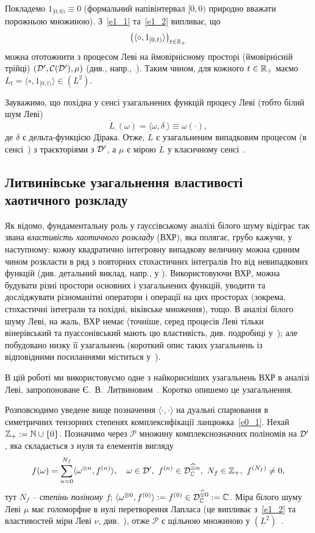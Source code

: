 Покладемо $1_{[0,0)}\equiv 0$ (формальний напівінтервал $[0,0)$ природно вважати порожньою множиною).
З~\eqref{e1_1} та~\eqref{e1_2} випливає, що
\[
    \big(\langle\circ,1_{[0,t)}\rangle\big)_{t\in\mathbb{R}_+}
\]
можна ототожнити з процесом Леві на ймовірнісному просторі (ймовірнісній трійці) $(\mathcal{D}',\mathcal{C}(\mathcal{D}'),\mu)$ (див., напр.,~\cite{NOP04,NOP09}).
Таким чином, для кожного $t\in\mathbb{R}_+$ маємо $L_t=\langle\circ,1_{[0,t)}\rangle\in (L^2)$.

Зауважимо, що похідна у сенсі узагальнених функцій процесу Леві (тобто білий шум Леві)
\[
    \dot L_\cdot(\omega)=\langle\omega,\delta_\cdot\rangle\equiv\omega(\cdot),
\]
де $\delta$ є дельта-функцією Дірака.
Отже, $\dot L$ є узагальненим випадковим процесом (в сенсі~\cite{GV61}) з траєкторіями з $\mathcal{D}'$, а $\mu$ є мірою $\dot L$ у класичному сенсі~\cite{GS73}.

\subsection{Литвинівське узагальнення властивості хаотичного розкладу}\label{S1_2}
Як відомо, фундаментальну роль у гауссівському аналізі білого шуму відіграє так звана {\it властивість хаотичного розкладу} (ВХР), яка полягає, грубо кажучи, у наступному: кожну квадратично інтегровну випадкову величину можна єдиним чином розкласти в ряд з повторних стохастичних інтегралів Іто від невипадкових функцій (див. детальний виклад, напр., у \cite{M93}).
Використовуючи ВХР, можна будувати різні простори основних і узагальнених функцій, уводити та досліджувати різноманітні оператори і операції на цих просторах (зокрема, стохастичні інтеграли та похідні, віківське множення), тощо. В аналізі білого шуму Леві, на жаль, ВХР немає (точніше, серед процесів Леві тільки вінерівський та пуассонівський мають цю властивість, див. подробиці у~\cite{S81}); але побудовано низку її узагальнень (короткий опис таких узагальнень із відповідними посиланнями міститься у~\cite{K21}).

В цій роботі ми використовуємо одне з найкорисніших узагальнень ВХР в аналізі Леві, запропоноване Є.~В.~Литвиновим~\cite{L03}.
Коротко опишемо це узагальнення.

Розповсюдимо уведене вище позначення $\langle\cdot,\cdot\rangle$ на дуальні спарювання в симетричних тензорних степенях комплексифікації ланцюжка~\eqref{e0_1}.
Нехай $\mathbb{Z}_+:=\mathbb{N}\cup\{0\}$.
Позначимо через $\mathcal P$ множину комплекснозначних поліномів на $\mathcal{D}'$, яка складається з нуля та елементів вигляду
\begin{equation*}
    f(\omega) = \sum_{n=0}^{N_f}\langle\omega^{\otimes n},f^{(n)}\rangle,
    \quad \omega\in\mathcal{D}',\ f^{(n)}\in\mathcal{D}_{\mathbb{C}}^{\widehat\otimes n},
\ N_f\in\mathbb{Z}_+,\ f^{(N_f)}\not=0,
\end{equation*}
тут $N_f$ -- {\it степінь поліному $f$}; $\langle\omega^{\otimes 0},f^{(0)}\rangle:=f^{(0)}\in \mathcal{D}_{\mathbb{C}}^{\widehat\otimes 0}:=\mathbb{C}$.
Міра білого шуму Леві $\mu$ має голоморфне в нулі перетворення Лапласа (це випливає з~\eqref{e1_2} та властивостей  міри Леві $\nu$, див.~\cite{L03}), отже $\mathcal P$ є щільною множиною у $(L^2)$~\cite{S75}.

